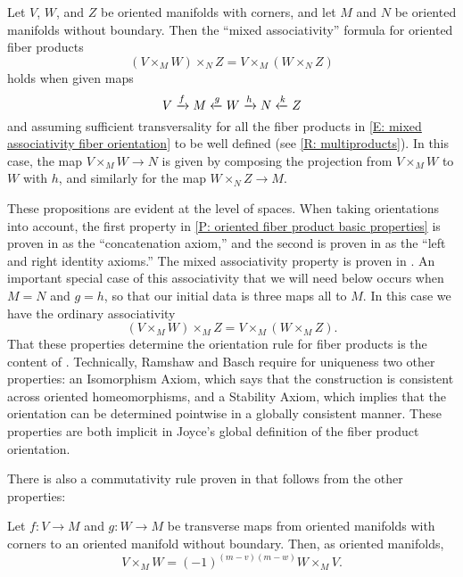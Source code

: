 \begin{proposition}\label{P: oriented fiber mixed associativity}
	Let $V$, $W$, and $Z$ be oriented manifolds with corners, and let $M$ and $N$ be oriented manifolds without boundary.
	Then the ``mixed associativity'' formula for oriented fiber products
	\begin{equation}\label{E: mixed associativity fiber orientation}
		(V \times_M W) \times_N Z = V \times_M (W \times_N Z)
	\end{equation}
	holds when given maps
	$$V \xrightarrow{f} M\xleftarrow{g} W \xrightarrow{h} N \xleftarrow{k} Z$$
	and assuming sufficient transversality for all the fiber products in \eqref{E: mixed associativity fiber orientation} to be well defined (see \cref{R: multiproducts}).
	In this case, the map $V \times_M W \to N$ is given by composing the projection from $V \times_M W$ to $W$ with $h$, and similarly for the map $W \times_N Z \to M$.
\end{proposition}

These propositions are evident at the level of spaces.
When taking orientations into account, the first property in \cref{P: oriented fiber product basic properties} is proven in \cite[Sections 9.3.9]{RamBas09} as the ``concatenation axiom,'' and the second is proven in \cite[Sections 9.3.5 and 9.3.6]{RamBas09} as the ``left and right identity axioms.''
The mixed associativity property is proven in \cite[Sections 9.3.7]{RamBas09}.
An important special case of this associativity that we will need below occurs when $M = N$ and $g = h$, so that our initial data is three maps all to $M$.
In this case we have the ordinary associativity
\begin{equation}\label{E: oriented fiber associativity}
	(V \times_M W) \times_M Z = V \times_M (W \times_M Z).
\end{equation}
That these properties determine the orientation rule for fiber products is the content of \cite[Theorem 9-10]{RamBas09}.
Technically, Ramshaw and Basch require for uniqueness two other properties: an Isomorphism Axiom, which says that the construction is consistent across oriented homeomorphisms, and a Stability Axiom, which implies that the orientation can be determined pointwise in a globally consistent manner.
These properties are both implicit in Joyce's global definition of the fiber product orientation.

There is also a commutativity rule proven in \cite[Sections 9.3.8]{RamBas09} that follows from the other properties:

\begin{proposition}\label{P: commute oriented fiber}
	Let $f \colon V \to M$ and $g \colon W \to M$ be transverse maps from oriented manifolds with corners to an oriented manifold without boundary.
	Then, as oriented manifolds,
	\begin{equation*}
		V \times_M W = (-1)^{(m-v)(m-w)}W \times_M V.
	\end{equation*}
\end{proposition}

